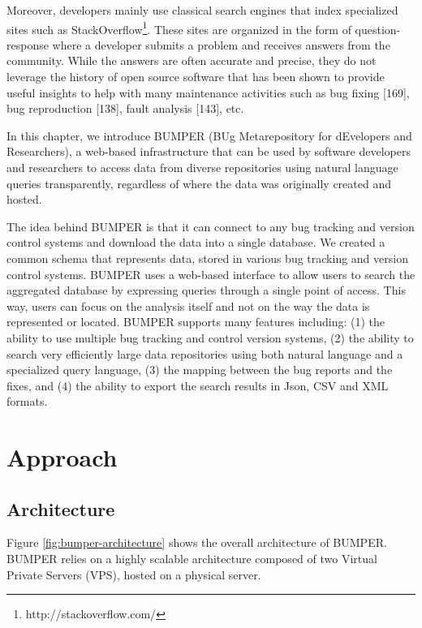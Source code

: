 \documentclass[12pt]{report}
\begin{document}
Moreover, developers mainly use classical search engines that index
specialized sites such as
StackOverflow\footnote{http://stackoverflow.com/}. These sites are
organized in the form of question-response where a developer submits a
problem and receives answers from the community. While the answers are
often accurate and precise, they do not leverage the history of open
source software that has been shown to provide useful insights to help
with many maintenance activities such as bug fixing {[}169{]}, bug
reproduction {[}138{]}, fault analysis {[}143{]}, etc.

In this chapter, we introduce BUMPER (BUg Metarepository for dEvelopers
and Researchers), a web-based infrastructure that can be used by
software developers and researchers to access data from diverse
repositories using natural language queries transparently, regardless of
where the data was originally created and hosted.

The idea behind BUMPER is that it can connect to any bug tracking and
version control systems and download the data into a single database. We
created a common schema that represents data, stored in various bug
tracking and version control systems. BUMPER uses a web-based interface
to allow users to search the aggregated database by expressing queries
through a single point of access. This way, users can focus on the
analysis itself and not on the way the data is represented or located.
BUMPER supports many features including: (1) the ability to use multiple
bug tracking and control version systems, (2) the ability to search very
efficiently large data repositories using both natural language and a
specialized query language, (3) the mapping between the bug reports and
the fixes, and (4) the ability to export the search results in Json, CSV
and XML formats.

\section{Approach}\label{approach}

\subsection{Architecture}\label{architecture}

Figure \ref{fig:bumper-architecture} shows the overall architecture of
BUMPER. BUMPER relies on a highly scalable architecture composed of two
Virtual Private Servers (VPS), hosted on a physical server.
\end{document}
